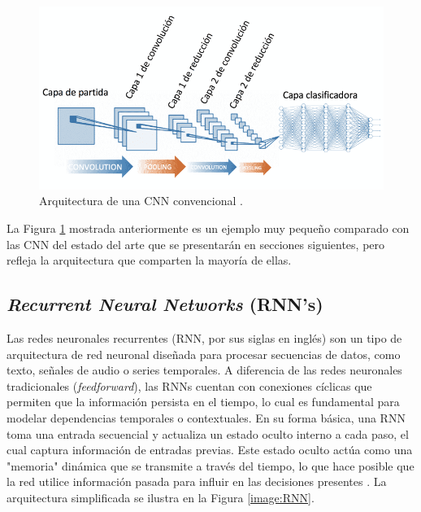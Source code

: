 \begin{figure}[h!] 
    \includegraphics[width=1\textwidth]{images/CNN.png} 
    \centering 
    \caption[Arquitectura de una CNN convencional ]
    {Arquitectura de una CNN convencional \protect \cite{CNN-Arquitectura}.}
    \label{CNN} 
\end{figure}

La Figura \ref{CNN} mostrada anteriormente es un ejemplo muy pequeño 
comparado con las CNN del estado del arte que se presentarán en 
secciones siguientes, pero refleja la arquitectura que comparten la 
mayoría de ellas.


\subsection{\textit{Recurrent Neural Networks} (RNN's)}\label{rnn}

Las redes neuronales recurrentes (RNN, por sus siglas en 
inglés) son un tipo de arquitectura de red neuronal diseñada 
para procesar secuencias de datos, como texto, señales de 
audio o series temporales. A diferencia de las redes neuronales 
tradicionales (\textit{feedforward}), las RNNs cuentan con conexiones 
cíclicas que permiten que la información persista en el 
tiempo, lo cual es fundamental para modelar dependencias 
temporales o contextuales. En su forma básica, una RNN 
toma una entrada secuencial y actualiza un estado oculto 
interno a cada paso, el cual captura información de entradas 
previas. Este estado oculto actúa como una "memoria" 
dinámica que se transmite a través del tiempo, lo que hace 
posible que la red utilice información pasada para influir 
en las decisiones presentes \cite{elman1990finding}. La 
arquitectura simplificada se ilustra en la Figura \ref{image:RNN}.


